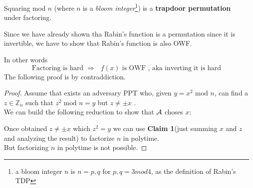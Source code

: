 \begin{theorem}
    Squaring mod $n$ (where $n$ is a \textit{bloom integer}\footnote{ a bloom
    integer $n$ is $n=p,q$ for $p,q=3 mod 4$, as the definition of Rabin's TDP})
    is a \textbf{trapdoor permutation} under factoring.
\end{theorem}
Since we have already shown tha Rabin's function is a permutation since it is
invertible, we have to show that Rabin's function is also OWF.

In other words
\[
    \text{Factoring is hard } \Rightarrow \text{ $f(x)$ is OWF , aka inverting
    it is hard}
\]
The following proof is by contraddiction.
\begin{proof}
    Assume that exists an adversary PPT who, given $y=x^{2} \text{ mod }
    n$, can find a $z \in \mathbb{Z}_{n} $ such that $z^{2} \text{ mod } n=y$
    but $z\neq \pm x$ .\\

    We can build the following reduction to show that $\mathcal{A}$ choses $x$:

\begin{figure}[ht]
   \centering
   \sdinit{}
\end{figure}

Once obtained $z\neq \pm x$ which $z^{2}=y$ we can use \textbf{Claim 1}(just
summing $x$ and $z$ and analyzing the result) to factorize $n$ in
polytime.\\

But factorizing $n$ in polytime is not possible.
\end{proof}


